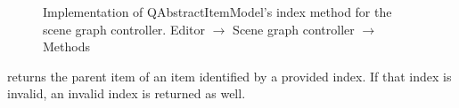 \documentclass[%
    a4paper,    %
    justified,  %
    nobib,      %
    openany     %
]{tufte-book}
\begin{document}
\begin{figure}
\begin{flushleft}
\begin{minipage}{\linewidth}
\begin{list}{}{\setlength{\itemsep}{-\parsep}\setlength{\itemindent}{-\leftmargin}}
\item{}
\end{list}
\end{minipage}\vspace{4ex}
\end{flushleft}
\caption{Implementation of QAbstractItemModel's index method for the scene graph
  controller.
  \newline{}\newline{}Editor $\rightarrow$ Scene graph controller $\rightarrow$
  Methods}
\label{editor:lst:scene-graph-controller:methods:index}
\end{figure}

 returns the parent item of an item identified by
a provided index. If that index is invalid, an invalid index is returned as
well.
\end{document}
